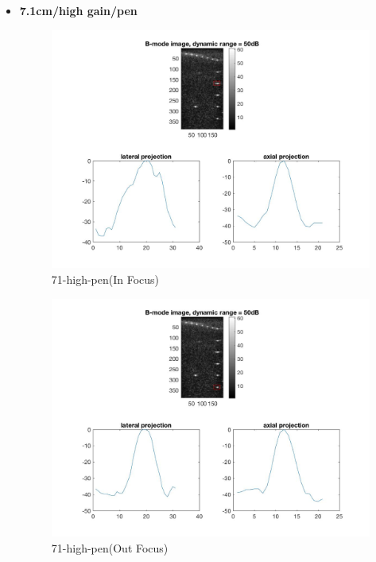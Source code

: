 \documentclass[12pts,a4paper]{article}
\begin{document}
\begin{itemize}
\pagebreak
\item{\textbf{7.1cm/high gain/pen}}
\begin{center}
\end{center}
\begin{figure}[h]
    \centering
    \includegraphics[width=1.0\textwidth]{img_hw1/71-high-pen1.jpg}
    \caption{71-high-pen(In Focus)}
    \label{fig:mesh1}
\end{figure}
\pagebreak
\begin{figure}[h]
    \centering
    \includegraphics[width=1.0\textwidth]{img_hw1/71-high-pen2.jpg}
    \caption{71-high-pen(Out Focus)}
    \label{fig:mesh1}
\end{figure}

\end{itemize}
\end{document}
